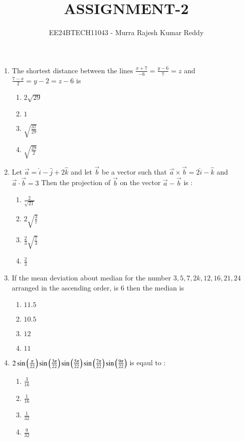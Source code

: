 \documentclass[journal,12pt,onecolumn,article]{IEEEtran}
\theoremstyle{remark}
\begin{document}

\vspace{3cm}
\title{ASSIGNMENT-2}
\author{EE24BTECH11043 - Murra Rajesh Kumar Reddy}
\maketitle
\bigskip
\begin{enumerate}
\item The shortest distance between the lines $\frac{x+7}{-6} = \frac{y-6}{7} = z$ and $\frac{7-x}{2} = y-2 = z-6$ is 
\begin{enumerate}
\item $2\sqrt{29}$
\item $1$
\item $\sqrt{\frac{37}{29}}$
\item $\sqrt{\frac{29}{2}}$
\end{enumerate}
\item Let $\vec{a} = \hat{i}-\hat{j}+2\hat{k}$ and let $\vec{b}$ be a vector such that $\vec{a} \times \vec{b} = 2\hat{i}-\hat{k}$ and $\vec{a} \cdot \vec{b} = 3$ Then the projection of $\vec{b}$ on the vector $\vec{a}-\vec{b}$ is :
\begin{enumerate}
\item $\frac{2}{\sqrt{21}}$
\item $2\sqrt{\frac{3}{7}}$
\item $\frac{2}{3}\sqrt{\frac{7}{3}}$
\item $\frac{2}{3}$
\end{enumerate}
\item If the mean deviation about median for the number $3,5,7,2k,12,16,21,24$ arranged in the ascending order, is 6 then the median is
\begin{enumerate}
\item $11.5$
\item $10.5$
\item $12$
\item $11$
\end{enumerate}
\item $2\sin\left(\frac{\pi}{22}\right)\sin\left(\frac{3\pi}{22}\right)\sin\left(\frac{5\pi}{22}\right)\sin\left(\frac{7\pi}{22}\right)\sin\left(\frac{9\pi}{22}\right)$ is eqaul to :
\begin{enumerate}
\item $\frac{3}{16}$
\item $\frac{1}{16}$
\item $\frac{1}{32}$
\item $\frac{9}{32}$
\end{enumerate}

\end{enumerate}
\end{document}
